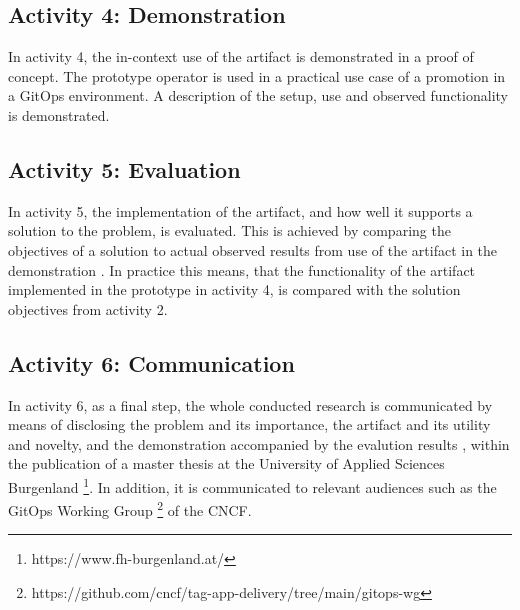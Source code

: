 \subsection{Activity 4: Demonstration}
\label{methodology:activity4}

\noindent
In activity 4,
the in-context use of the artifact is demonstrated in a proof of concept.
The prototype operator is used in a practical use case of a promotion in a GitOps environment.
A description of the setup, use and observed functionality is demonstrated.
%
\bigskip

\subsection{Activity 5: Evaluation}
\label{methodology:activity5}

\noindent
In activity 5,
the implementation of the artifact,
and how well it supports a solution to the problem,
is evaluated.
This is achieved by
comparing the objectives of a solution to actual observed results
from use of the artifact in the demonstration
\autocite{designScienceResearchMethodologyForInformationSystemsResearch}.
In practice this means, that
the functionality of the artifact implemented in the prototype in activity 4,
is compared with the solution objectives from activity 2.
\bigskip

\subsection{Activity 6: Communication}
\label{methodology:activity6}

\noindent
In activity 6, as a final step,
the whole conducted research is communicated by means of
disclosing
the problem and its importance,
the artifact and its utility and novelty,
and the demonstration accompanied by the evalution results
\autocite{designScienceResearchMethodologyForInformationSystemsResearch},
within the publication of a master thesis at
the University of Applied Sciences Burgenland
\footnote{https://www.fh-burgenland.at/}.
In addition, it is communicated to relevant audiences such as
the GitOps Working Group
\footnote{https://github.com/cncf/tag-app-delivery/tree/main/gitops-wg}
of the CNCF.






